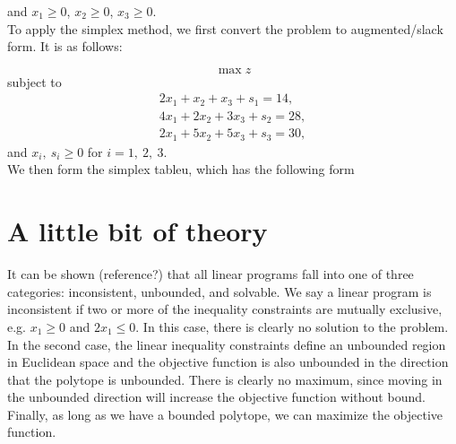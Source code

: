 \documentclass[12pt,english]{article}
\begin{document}
and $x_1 \geq 0$, $x_2 \geq 0$, $x_3 \geq 0$. \\

To apply the simplex method, we first convert the problem to augmented/slack form.  It is as follows:

$$
\max z
$$
subject to 
$$
\begin{array}{c}
2 x_1 + x_2 + x_3 + s_1 = 14, \\
4 x_1 + 2 x_2 + 3 x_3 + s_2 = 28, \\
2 x_1 + 5 x_2 + 5 x_3 + s_3 = 30,
\end{array}
$$
and $x_i, ~ s_i \geq 0$ for $i=1, ~2, ~3.$ \\

We then form the simplex tableu, which has the following form

\section{A little bit of theory}

It can be shown (reference?) that all linear programs fall into one of three categories: inconsistent, unbounded, and solvable.  We say a linear program is inconsistent if two or more of the inequality constraints are mutually exclusive, e.g. $x_1 \geq 0$ and $2 x_1 \leq 0$.  In this case, there is clearly no solution to the problem.   In the second case, the linear inequality constraints define an unbounded region in Euclidean space and the objective function is also unbounded in the direction that the polytope is unbounded.  There is clearly no maximum, since moving in the unbounded direction will increase the objective function without bound.  Finally, as long as we have a bounded polytope, we can maximize the objective function. \\
\end{document}
